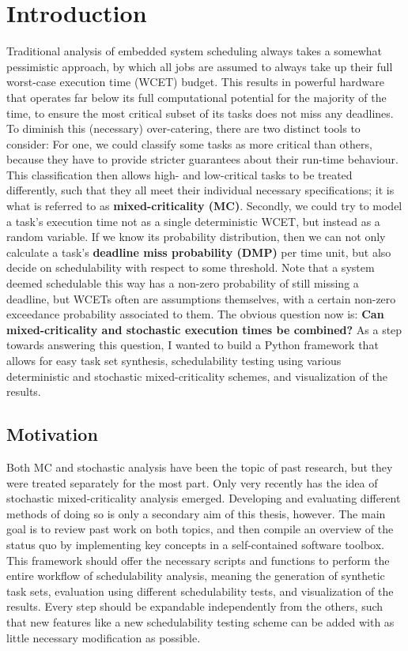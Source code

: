 \documentclass[a4paper,oneside]{csthesis}
\begin{document}
\chapter{Introduction}
Traditional analysis of embedded system scheduling always takes a somewhat pessimistic approach, by which all jobs are assumed to always take up their full worst-case execution time (WCET) budget. This results in powerful hardware that operates far below its full computational potential for the majority of the time, to ensure the most critical subset of its tasks does not miss any deadlines. To diminish this (necessary) over-catering, there are two distinct tools to consider: For one, we could classify some tasks as more critical than others, because they have to provide stricter guarantees about their run-time behaviour. This classification then allows high- and low-critical tasks to be treated differently, such that they all meet their individual necessary specifications; it is what is referred to as \textbf{mixed-criticality (MC)}. Secondly, we could try to model a task's execution time not as a single deterministic WCET, but instead as a random variable. If we know its probability distribution, then we can not only calculate a task's \textbf{deadline miss probability (DMP)} per time unit, but also decide on schedulability with respect to some threshold. Note that a system deemed schedulable this way has a non-zero probability of still missing a deadline, but WCETs often are assumptions themselves, with a certain non-zero exceedance probability associated to them. The obvious question now is: \textbf{Can mixed-criticality and stochastic execution times be combined?} As a step towards answering this question, I wanted to build a Python framework that allows for easy task set synthesis, schedulability testing using various deterministic and stochastic mixed-criticality schemes, and visualization of the results.

\section{Motivation}
Both MC and stochastic analysis have been the topic of past research, but they were treated separately for the most part. Only very recently has the idea of stochastic mixed-criticality analysis emerged. Developing and evaluating different methods of doing so is only a secondary aim of this thesis, however. The main goal is to review past work on both topics, and then compile an overview of the status quo by implementing key concepts in a self-contained software toolbox. This framework should offer the necessary scripts and functions to perform the entire workflow of schedulability analysis, meaning the generation of synthetic task sets, evaluation using different schedulability tests, and visualization of the results. Every step should be expandable independently from the others, such that new features like a new schedulability testing scheme can be added with as little necessary modification as possible.
\end{document}
